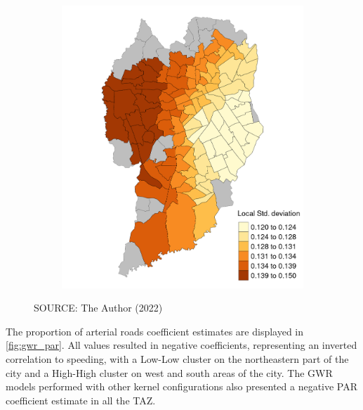 \begin{figure}[!htbp]
\begin{subfigure}{0.5\textwidth}
        \includegraphics{fig/summary_sd_sp.png}
    \end{subfigure}    
    \label{fig:sp_mean}
    \par SOURCE: The Author (2022)
\end{figure}


The proportion of arterial roads coefficient estimates are displayed in \autoref{fig:gwr_par}. All values resulted in negative coefficients, representing an inverted correlation to speeding, with a Low-Low cluster on the northeastern part of the city and a High-High cluster on west and south areas of the city. The GWR models performed with other kernel configurations also presented a negative PAR coefficient estimate in all the TAZ.


